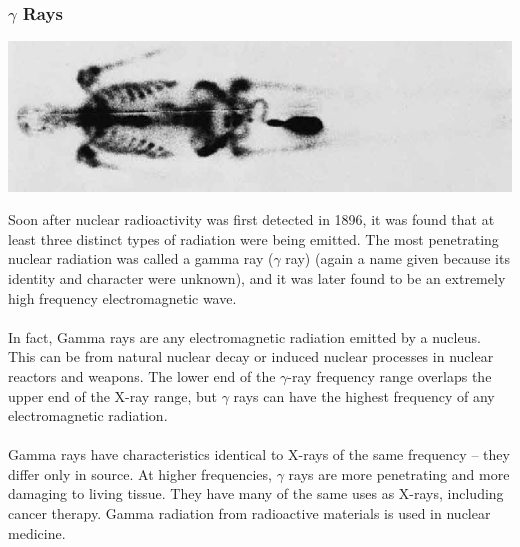 \documentclass[11pt]{article}
\begin{document}
\subsubsection*{$\gamma$ Rays}
\begin{center}
	\includegraphics[scale=1.2]{gamma}
\end{center}
Soon after nuclear radioactivity was first detected in 1896, it was found that at least three distinct types of radiation were being emitted. The most penetrating nuclear radiation was called a gamma ray ($\gamma$ ray) (again a name given because its identity and character were unknown), and it was later found to be an extremely high frequency electromagnetic wave. \\ \\
In fact,  Gamma rays are any electromagnetic radiation emitted by a nucleus. This can be from natural nuclear decay or induced nuclear processes in nuclear reactors and weapons. The lower end of the  $\gamma$-ray frequency range overlaps the upper end of the X-ray range, but  $\gamma$ rays can have the highest frequency of any electromagnetic radiation. \\ \\
Gamma rays have characteristics identical to X-rays of the same frequency -- they differ only in source. At higher frequencies,  $\gamma$ rays are more penetrating and more damaging to living tissue. They have many of the same uses as X-rays, including cancer therapy. Gamma radiation from radioactive materials is used in nuclear medicine.












 
\end{document}
